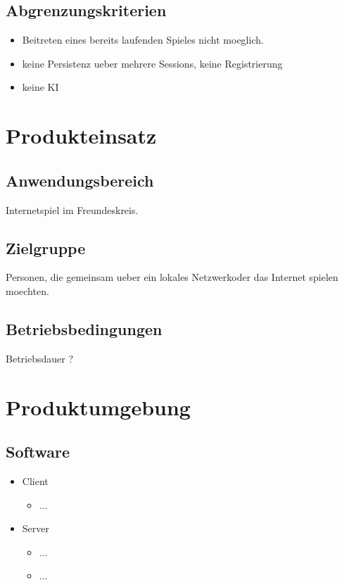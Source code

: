 \documentclass{article}
\begin{document}
\subsection{Abgrenzungskriterien}
\begin{itemize}
	\item Beitreten eines bereits laufenden Spieles nicht moeglich.
	\item keine Persistenz ueber mehrere Sessions, keine Registrierung
	\item keine KI
\end{itemize}

\section{Produkteinsatz}
\subsection{Anwendungsbereich}
Internetspiel im Freundeskreis.
\subsection{Zielgruppe}
Personen, die gemeinsam ueber ein lokales Netzwerkoder das Internet spielen moechten. 
\subsection{Betriebsbedingungen}
Betriebsdauer ?

\section{Produktumgebung}
\subsection{Software}
	\begin{itemize}
		\item \gls{Client}
		\begin{itemize}
			\item ...
		\end{itemize}
		\item \gls{Server}
		\begin{itemize}
			\item ...	
			\item ...
		\end{itemize}
	\end{itemize}
\end{document}
